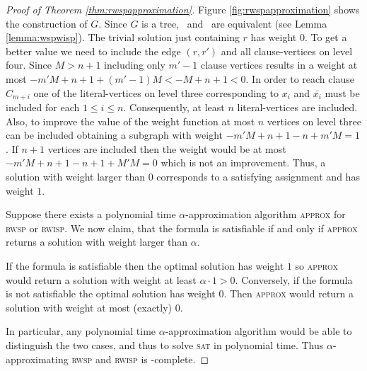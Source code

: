 \begin{proof}[Proof of Theorem \ref{thm:rwspapproximation}]
	Figure \ref{fig:rwspapproximation} shows the construction of $G$. Since $G$ is a tree, \maxWSP\ and \maxWISP\ are equivalent (see Lemma \ref{lemma:wspwisp}). The trivial solution just containing $r$ has weight $0$. To get a better value we need to include the edge $(r, r')$ and all clause-vertices on level four. Since $M > n+1$ including only $m' - 1$ clause vertices results in a weight at most $-m'M+n+1 + (m'-1)M < - M + n+1 < 0$. In order to reach clause $C_{m+i}$ one of the literal-vertices on level three corresponding to $x_i$ and $\bar{x_i}$ must be included for each $1 \leq i \leq n$. Consequently, at least $n$ literal-vertices are included. Also, to improve the value of the weight function at most $n$ vertices on level three can be included obtaining a subgraph with weight $-m'M+n+1 -n +m'M = 1$. If $n+1$ vertices are included then the weight would be at most $- m'M+n+1 -n+1 + M'M = 0$ which is not an improvement. Thus, a solution with weight larger than $0$ corresponds to a satisfying assignment and has weight $1$.\medskip
		
	Suppose there exists a polynomial time $\alpha$-approximation algorithm \textsc{approx} for \textsc{rwsp} or \textsc{rwisp}.
	We now claim, that the formula is satisfiable if and only if \textsc{approx} returns a solution with weight larger than $\alpha$.\medskip
	
	If the formula is satisfiable then the optimal solution has weight $1$ so \textsc{approx} would return a solution with weight at least $\alpha\cdot1 > 0$. Conversely, if the formula is not satisfiable the optimal solution has weight $0$. Then \textsc{approx} would return a solution with weight at most (exactly) $0$.\medskip
	
	In particular, any polynomial time $\alpha$-approximation algorithm would be able to distinguish the two cases, and thus to solve \textsc{sat} in polynomial time. Thus $\alpha$-approximating \textsc{rwsp} and \textsc{rwisp} is \NP-complete.\medskip
	

\end{proof}
